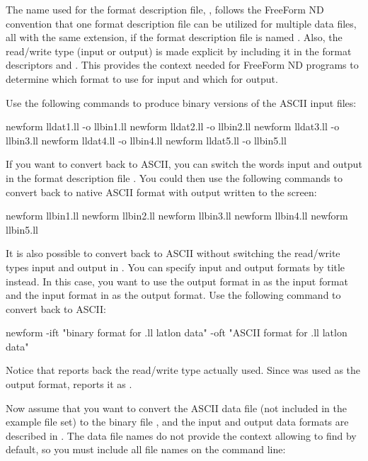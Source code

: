 The name used for the format description file, , follows
the FreeForm ND convention that one format description file can be
utilized for multiple data files, all with the same extension, if the
format description file is named . Also, the read/write
type (input or output) is made explicit by including it in the format
descriptors  and .
This provides the context needed for FreeForm ND programs to determine
which format to use for input and which for output.

Use the following commands to produce binary versions of the ASCII
input files:

\begin{example}
newform lldat1.ll -o llbin1.ll
newform lldat2.ll -o llbin2.ll
newform lldat3.ll -o llbin3.ll
newform lldat4.ll -o llbin4.ll
newform lldat5.ll -o llbin5.ll 
\end{example}

If you want to convert back to ASCII, you can switch the words input
and output in the format description file . You could then
use the following commands to convert back to native ASCII format with
output written to the screen:

\begin{example}
newform llbin1.ll
newform llbin2.ll
newform llbin3.ll
newform llbin4.ll
newform llbin5.ll 
\end{example}

It is also possible to convert back to ASCII without switching the
read/write types input and output in . You can specify
input and output formats by title instead. In this case, you want to
use the output format in  as the input format and the
input format in  as the output format. Use the following
command to convert  back to ASCII:

\begin{example}
newform  -ift "binary format for .ll latlon data" 
       -oft "ASCII format for .ll latlon data" 
\end{example}

Notice that  reports back the read/write type actually
used. Since  was used as the output format,
 reports it as .

Now assume that you want to convert the ASCII data file
 (not included in the example file set) to the binary
file , and the input and output data formats are
described in . The data file names do not provide the
context allowing  to find  by default, so
you must include all file names on the command line:

